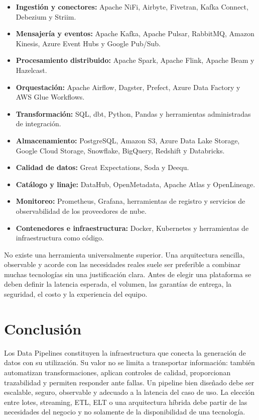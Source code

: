 \begin{itemize}
    \item \textbf{Ingestión y conectores:} Apache NiFi, Airbyte, Fivetran,
    Kafka Connect, Debezium y Striim.

    \item \textbf{Mensajería y eventos:} Apache Kafka, Apache Pulsar,
    RabbitMQ, Amazon Kinesis, Azure Event Hubs y Google Pub/Sub.

    \item \textbf{Procesamiento distribuido:} Apache Spark, Apache Flink,
    Apache Beam y Hazelcast.

    \item \textbf{Orquestación:} Apache Airflow, Dagster, Prefect, Azure Data
    Factory y AWS Glue Workflows.

    \item \textbf{Transformación:} SQL, dbt, Python, Pandas y herramientas
    administradas de integración.

    \item \textbf{Almacenamiento:} PostgreSQL, Amazon S3, Azure Data Lake
    Storage, Google Cloud Storage, Snowflake, BigQuery, Redshift y Databricks.

    \item \textbf{Calidad de datos:} Great Expectations, Soda y Deequ.

    \item \textbf{Catálogo y linaje:} DataHub, OpenMetadata, Apache Atlas y
    OpenLineage.

    \item \textbf{Monitoreo:} Prometheus, Grafana, herramientas de registro y
    servicios de observabilidad de los proveedores de nube.

    \item \textbf{Contenedores e infraestructura:} Docker, Kubernetes y
    herramientas de infraestructura como código.
\end{itemize}

No existe una herramienta universalmente superior. Una arquitectura sencilla,
observable y acorde con las necesidades reales suele ser preferible a combinar
muchas tecnologías sin una justificación clara. Antes de elegir una plataforma
se deben definir la latencia esperada, el volumen, las garantías de entrega, la
seguridad, el costo y la experiencia del equipo.

\section*{Conclusión}

Los Data Pipelines constituyen la infraestructura que conecta la generación de
datos con su utilización. Su valor no se limita a transportar información:
también automatizan transformaciones, aplican controles de calidad, proporcionan
trazabilidad y permiten responder ante fallas. Un pipeline bien diseñado debe
ser escalable, seguro, observable y adecuado a la latencia del caso de uso. La
elección entre lotes, streaming, ETL, ELT o una arquitectura híbrida debe partir
de las necesidades del negocio y no solamente de la disponibilidad de una
tecnología.
